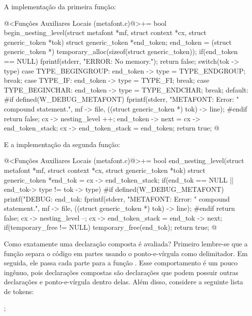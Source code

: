 A implementação da primeira função:

\iniciocodigo
@<Funções Auxiliares Locais (metafont.c)@>+=
bool begin_nesting_level(struct metafont *mf, struct context *cx,
                         struct generic_token *tok){
  struct generic_token *end_token;
  end_token = (struct generic_token *)
                    temporary_alloc(sizeof(struct generic_token));
  if(end_token == NULL){
    fprintf(stderr, "ERROR: No memory.");
    return false;
  }
  switch(tok -> type){
  case TYPE_BEGINGROUP:
    end_token -> type = TYPE_ENDGROUP;
    break;
  case TYPE_IF:
    end_token -> type = TYPE_FI;
    break;
  case TYPE_BEGINCHAR:
    end_token -> type = TYPE_ENDCHAR;
    break;
  default:
#if defined(W_DEBUG_METAFONT)
      fprintf(stderr,
              "METAFONT: Error: %
              " compound statement.\n", mf -> file,
              ((struct generic_token *) tok) -> line);
#endif
      return false;
  }
  cx -> nesting_level ++;
  end_token -> next = cx -> end_token_stack;
  cx -> end_token_stack = end_token;
  return true;
}
@
\fimcodigo

E a implementação da segunda função:

\iniciocodigo
@<Funções Auxiliares Locais (metafont.c)@>+=
bool end_nesting_level(struct metafont *mf, struct context *cx,
                       struct generic_token *tok){
  struct generic_token *end_tok = cx -> end_token_stack;
  if(end_tok == NULL || end_tok-> type != tok -> type){
#if defined(W_DEBUG_METAFONT)
    printf("DEBUG: end_tok: %
    fprintf(stderr,
            "METAFONT: Error: %
            " compound statement.\n", mf -> file,
            ((struct generic_token *) tok) -> line);
#endif
    return false;
  }
  cx -> nesting_level --;
  cx -> end_token_stack = end_tok -> next;
  if(temporary_free != NULL)
    temporary_free(end_tok);
  return true;
}
@
\fimcodigo

Como exatamente uma declaração composta é avaliada? Primeiro lembre-se
que a função  separa o código
em partes usando o ponto-e-vírgula como delimitador. Em seguida, ele
passa cada parte para a função . Esse
comportamento é um pouco ingênuo, pois declarações compostas são
declarações que podem possuir outras declarações e ponto-e-vírgula
dentro delas. Além disso, considere a seguinte lista de tokens:

\alinhaverbatim
[begingroup][T1][T2][;][T3][T4][;][endgroup][T5];
\alinhanormal

